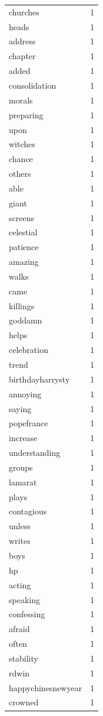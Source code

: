 \begin{tabular}{lr}
churches & 1 \\
heads & 1 \\
address & 1 \\
chapter & 1 \\
added & 1 \\
consolidation & 1 \\
morals & 1 \\
preparing & 1 \\
upon & 1 \\
witches & 1 \\
chance & 1 \\
others & 1 \\
able & 1 \\
giant & 1 \\
screens & 1 \\
celestial & 1 \\
patience & 1 \\
amazing & 1 \\
walks & 1 \\
came & 1 \\
killings & 1 \\
goddamn & 1 \\
helps & 1 \\
celebration & 1 \\
trend & 1 \\
birthdayharrysty & 1 \\
annoying & 1 \\
saying & 1 \\
popefrance & 1 \\
increase & 1 \\
understanding & 1 \\
groups & 1 \\
lamarat & 1 \\
plays & 1 \\
contagious & 1 \\
unless & 1 \\
writes & 1 \\
boys & 1 \\
hp & 1 \\
acting & 1 \\
speaking & 1 \\
confessing & 1 \\
afraid & 1 \\
often & 1 \\
stability & 1 \\
rdwin & 1 \\
happychinesnewyear & 1 \\
crowned & 1 \\

\end{tabular}
